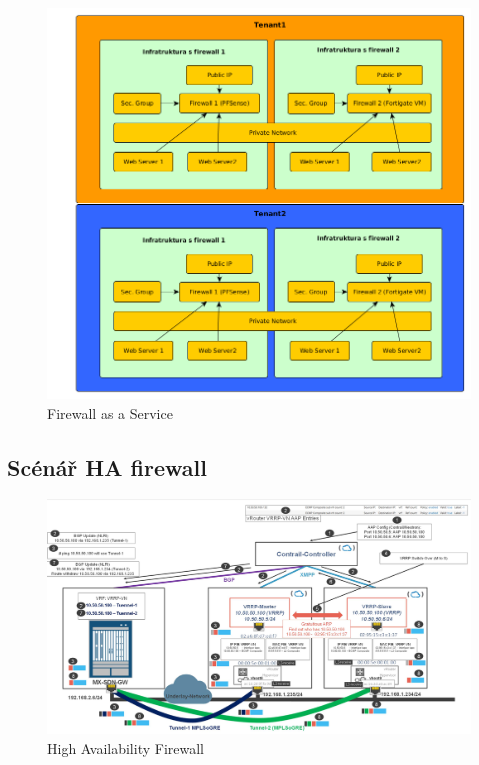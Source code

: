 \begin{figure}[h]
\begin{centering}
\includegraphics[scale=0.43]{images/firewall}
\par\end{centering}
\caption{Firewall as a Service\label{fig:firewall}}
\end{figure}

\subsection{Scénář HA firewall}

\begin{figure}[h]
\begin{centering}
\includegraphics[scale=0.11]{images/contrailHA}
\par\end{centering}
\caption{High Availability Firewall\label{fig:contrailHA}}
\end{figure}


